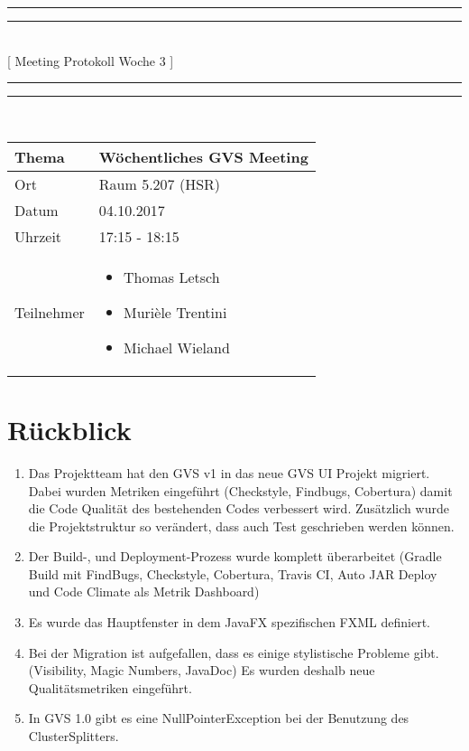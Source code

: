 \documentclass[11pt, a4paper,oneside]{scrartcl}
\begin{document}
\centering
\rule{\textwidth}{1.6pt}\vspace*{-\baselineskip}\vspace*{2pt} %
\rule{\textwidth}{0.4pt}\\[\baselineskip] %
{\LARGE [ Meeting Protokoll Woche 3 ]}\\[0.2\baselineskip] %
\rule{\textwidth}{0.4pt}\vspace*{-\baselineskip}\vspace{3.2pt} %
\rule{\textwidth}{1.6pt}\\[2\baselineskip] %

\begin{tabu} to \linewidth {l X }
	\toprule
	\textbf{Thema} & \textbf{Wöchentliches GVS Meeting} \\
	\midrule
	Ort & Raum 5.207 (HSR) \\
	Datum & 04.10.2017 \\
	Uhrzeit & 17:15 - 18:15 \\
	Teilnehmer & 
	\begin{minipage}[t]{\textwidth}
	  	\begin{itemize}
	  		\item Thomas Letsch
			\item Murièle Trentini
			\item Michael Wieland
	  	\end{itemize}
	\end{minipage}
	\\
	\bottomrule
\end{tabu}


\section{Rückblick}
\begin{enumerate}
	\item Das Projektteam hat den GVS v1 in das neue GVS UI Projekt migriert. Dabei wurden Metriken eingeführt (Checkstyle, Findbugs, Cobertura) damit die Code Qualität des bestehenden Codes verbessert wird. Zusätzlich wurde die Projektstruktur so verändert, dass auch Test geschrieben werden können.
	\item Der Build-, und Deployment-Prozess wurde komplett überarbeitet (Gradle Build mit FindBugs, Checkstyle, Cobertura, Travis CI, Auto JAR Deploy und Code Climate als Metrik Dashboard)
	\item Es wurde das Hauptfenster in dem JavaFX spezifischen FXML definiert.
	\item Bei der Migration ist aufgefallen, dass es einige stylistische Probleme gibt. (Visibility, Magic Numbers, JavaDoc) Es wurden deshalb neue Qualitätsmetriken eingeführt.
	\item In GVS 1.0 gibt es eine NullPointerException bei der Benutzung des ClusterSplitters.
\end{enumerate}
\end{document}
